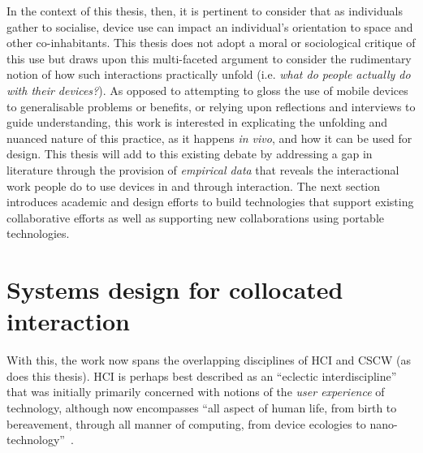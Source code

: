 In the context of this thesis, then, it is pertinent to consider that as individuals gather to socialise, device use can impact an individual's orientation to space and other co-inhabitants.
This thesis does not adopt a moral or sociological critique of this use but draws upon this multi-faceted argument to consider the rudimentary notion of how such interactions practically unfold (i.e. \textit{what do people actually do with their devices?}). %
As opposed to attempting to gloss the use of mobile devices to generalisable problems or benefits, or relying upon reflections and interviews to guide understanding, this work is interested in explicating the unfolding and nuanced nature of this practice, as it happens \textit{in vivo}, and how it can be used for design.
This thesis will add to this existing debate by addressing a gap in literature through the provision of \textit{empirical data} that reveals the interactional work people do to use devices in and through interaction.
The next section introduces academic and design efforts to build technologies that support existing collaborative efforts as well as supporting new collaborations using portable technologies.






\section{Systems design for collocated interaction}\label{sec:background litreview design}
With this, the work now spans the overlapping disciplines of \ac{HCI} and \ac{CSCW} (as does this thesis).
\ac{HCI} is perhaps best described as an ``eclectic interdiscipline'' that was initially primarily concerned with notions of the \textit{user experience} of technology, although now encompasses ``all aspect of human life, from birth to bereavement, through all manner of computing, from device ecologies to nano-technology''~\citep[p. vii]{Rogers2012}.

